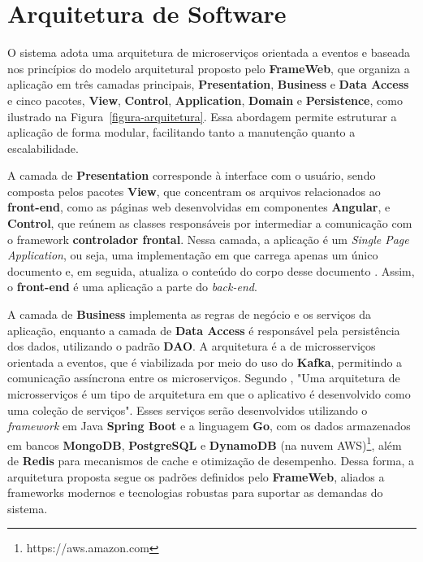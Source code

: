 
\chapter{Arquitetura de Software}
\label{sec-arquitetura}
\vspace{-1cm}

O sistema \emph{\imprimirtitulo} adota uma arquitetura de microserviços orientada a eventos e baseada nos princípios do modelo arquitetural proposto pelo \textbf{FrameWeb}, que organiza a aplicação em três camadas principais, \textbf{Presentation}, \textbf{Business} e \textbf{Data Access} e cinco pacotes, \textbf{View}, \textbf{Control}, \textbf{Application}, \textbf{Domain} e \textbf{Persistence}, como ilustrado na Figura~\ref{figura-arquitetura}. Essa abordagem permite estruturar a aplicação de forma modular, facilitando tanto a manutenção quanto a escalabilidade. 

A camada de \textbf{Presentation} corresponde à interface com o usuário, sendo composta pelos pacotes \textbf{View}, que concentram os arquivos relacionados ao \textbf{front-end}, como as páginas web desenvolvidas em componentes \textbf{Angular}, e \textbf{Control}, que reúnem as classes responsáveis por intermediar a comunicação com o framework \textbf{controlador frontal}. Nessa camada, a aplicação é um \textit{Single Page Application}, ou seja, uma implementação em que carrega apenas um único documento e, em seguida, atualiza o conteúdo do corpo desse documento \cite{mdn_spa}. Assim, o \textbf{front-end} é uma aplicação a parte do \textit{back-end}.

A camada de \textbf{Business} implementa as regras de negócio e os serviços da aplicação, enquanto a camada de \textbf{Data Access} é responsável pela persistência dos dados, utilizando o padrão \textbf{DAO}. A arquitetura é a de microsserviços orientada a eventos, que é viabilizada por meio do uso do \textbf{Kafka}, permitindo a comunicação assíncrona entre os microserviços. Segundo , "Uma arquitetura de microsserviços é um tipo de arquitetura em que o aplicativo é desenvolvido como uma coleção de serviços". Esses serviços serão desenvolvidos utilizando o \textit{framework} em Java \textbf{Spring Boot} e a linguagem \textbf{Go}, com os dados armazenados em bancos \textbf{MongoDB}, \textbf{PostgreSQL} e \textbf{DynamoDB} (na nuvem AWS)\footnote{https://aws.amazon.com}, além de \textbf{Redis} para mecanismos de cache e otimização de desempenho. Dessa forma, a arquitetura proposta segue os padrões definidos pelo \textbf{FrameWeb}, aliados a frameworks modernos e tecnologias robustas para suportar as demandas do sistema.

